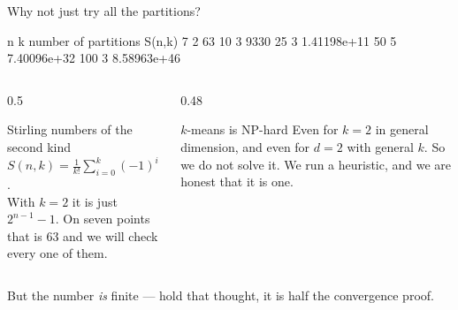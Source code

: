 \documentclass[aspectratio=169]{beamer}
\begin{document}
\begin{frame}[fragile,shrink=8]{Why not just try all the partitions?}
\begin{outblk}
   n      k    number of partitions S(n,k)
     7      2    63
    10      3    9330
    25      3    1.41198e+11
    50      5    7.40096e+32
   100      3    8.58963e+46
\end{outblk}
  \vspace{0.2em}
  \begin{columns}[T]
    \begin{column}{0.5\textwidth}
      \begin{block}{Stirling numbers of the second kind}
        \small
        $S(n,k) = \frac{1}{k!}\sum_{i=0}^{k}(-1)^i \binom{k}{i}(k-i)^n$.
        \\[0.3em]
        With $k = 2$ it is just $2^{n-1}-1$. On seven points that is $63$
        and we will check every one of them.
      \end{block}
    \end{column}
    \begin{column}{0.48\textwidth}
      \begin{alertblock}{$k$-means is NP-hard}
        \small Even for $k = 2$ in general dimension, and even for $d = 2$
        with general $k$. So we do not solve it. We run a heuristic, and we
        are honest that it is one.
      \end{alertblock}
    \end{column}
  \end{columns}
  \vspace{0.2em}
  \begin{center}\small
    But the number \emph{is} finite --- hold that thought, it is half the
    convergence proof.
  \end{center}
\end{frame}
\end{document}
